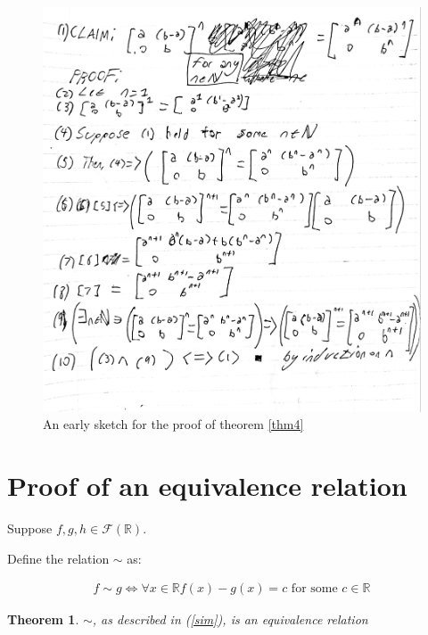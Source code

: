 \documentclass[12pt]{article}
\newcommand{\reals}{\mathbb{R}}
\newcommand{\freals}{\mathcal{F}(\reals)}
\newtheorem{thm}{Theorem}
\begin{document}
\begin{figure}
	\includegraphics[scale=0.17]{proof12.jpg}
	\caption{An early sketch for the proof of theorem \ref{thm4}}
	\centering
	\label{proof12}
\end{figure}

\section{Proof of an equivalence relation}

Suppose $f,g,h \in \freals$.

Define the relation $\sim$ as:

\begin{align} \label{sim}
	f \sim g \iff \forall x \in \reals f(x) - g(x) = c \text{ for some } c \in \reals
\end{align}

\begin{thm} \label{thm5}
	$\sim$, as described in (\ref{sim}), is an equivalence relation
\end{thm}
\end{document}
